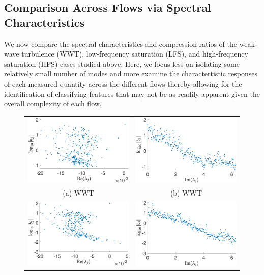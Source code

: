 \documentclass[a4paper,11pt]{article}
\begin{document}
\subsection*{Comparison Across Flows via Spectral Characteristics}
We now compare the spectral characteristics and compression ratios of the weak-wave turbulence (WWT), low-frequency saturation (LFS), and high-frequency saturation (HFS) cases studied above.  Here, we focus less on isolating some relatively small number of modes and more examine the charactertistic responses of each measured quantity across the different flows thereby allowing for the identification of classifying features that may not be as readily apparent given the overall complexity of each flow.  
\begin{figure}[!ht]
\centering
\begin{tabular}{cc}
\includegraphics[width=.525\textwidth]{bvals_vs_real_lam_wwtforce_K_128_Lx_128_tf_1_pt5e4} &\hspace{-25pt} \includegraphics[width=.525\textwidth]{bvals_vs_imag_lam_wwtforce_K_128_Lx_128_tf_1_pt5e4}\\
(a) WWT & (b) WWT\\
\includegraphics[width=.525\textwidth]{bvals_vs_real_lam_lfforce_K_128_Lx_128_tf_1_pt5e4} &\hspace{-25pt} \includegraphics[width=.525\textwidth]{bvals_vs_imag_lam_lfforce_K_128_Lx_128_tf_1_pt5e4}\\

\end{tabular}
\end{figure}
\end{document}
